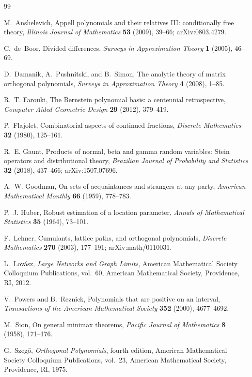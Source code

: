 \documentclass[11pt]{article}
\numberwithin{equation}{section}
\begin{document}
\begin{thebibliography}{99}

  M.~Anshelevich,
  \newblock Appell polynomials and their relatives III: conditionally free theory,
  \newblock \emph{Illinois Journal of Mathematics} \textbf{53} (2009), 39--66;
  \newblock arXiv:0803.4279.

  C.~de~Boor,
  \newblock Divided differences,
  \newblock \emph{Surveys in Approximation Theory} \textbf{1} (2005), 46--69.

  D.~Damanik, A.~Pushnitski, and B.~Simon,
  \newblock The analytic theory of matrix orthogonal polynomials,
  \newblock \emph{Surveys in Approximation Theory} \textbf{4} (2008), 1--85.

  R.~T. Farouki,
  \newblock The Bernstein polynomial basis: a centennial retrospective,
  \newblock \emph{Computer Aided Geometric Design} \textbf{29} (2012),
  379--419.

  P.~Flajolet,
  \newblock Combinatorial aspects of continued fractions,
  \newblock \emph{Discrete Mathematics} \textbf{32} (1980), 125--161.

  R.~E. Gaunt,
  \newblock Products of normal, beta and gamma random variables: Stein
  operators and distributional theory,
  \newblock \emph{Brazilian Journal of Probability and Statistics}
  \textbf{32} (2018), 437--466;
  \newblock arXiv:1507.07696.

  A.~W. Goodman,
  \newblock On sets of acquaintances and strangers at any party,
  \newblock \emph{American Mathematical Monthly} \textbf{66} (1959),
  778--783.

  P.~J. Huber,
  \newblock Robust estimation of a location parameter,
  \newblock \emph{Annals of Mathematical Statistics} \textbf{35} (1964),
  73--101.

  F.~Lehner,
  \newblock Cumulants, lattice paths, and orthogonal polynomials,
  \newblock \emph{Discrete Mathematics} \textbf{270} (2003), 177--191;
  \newblock arXiv:math/0110031.

  L.~Lov\'asz,
  \newblock \emph{Large Networks and Graph Limits},
  \newblock American Mathematical Society Colloquium Publications, vol.~60,
  American Mathematical Society, Providence, RI, 2012.

  V.~Powers and B.~Reznick,
  \newblock Polynomials that are positive on an interval,
  \newblock \emph{Transactions of the American Mathematical Society}
  \textbf{352} (2000), 4677--4692.

  M.~Sion,
  \newblock On general minimax theorems,
  \newblock \emph{Pacific Journal of Mathematics} \textbf{8} (1958),
  171--176.

  G.~Szeg\H{o},
  \newblock \emph{Orthogonal Polynomials}, fourth edition,
  \newblock American Mathematical Society Colloquium Publications, vol.~23,
  American Mathematical Society, Providence, RI, 1975.

\end{thebibliography}
\end{document}
